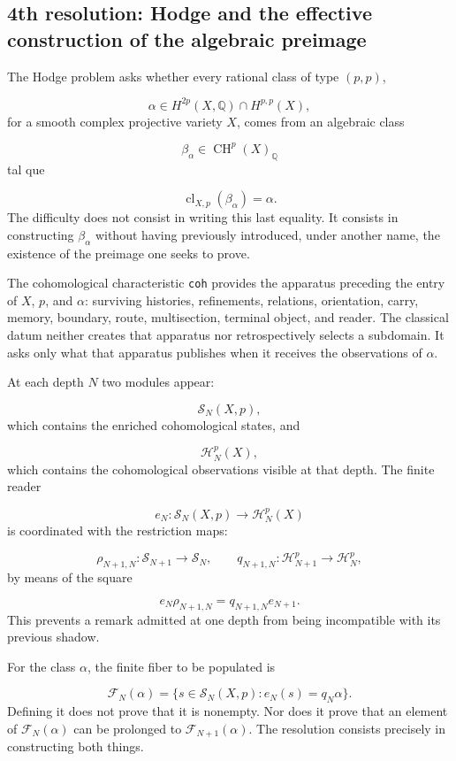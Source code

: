 \subsection{4th resolution: Hodge and the effective construction of the algebraic preimage}
The Hodge problem asks whether every rational class of type \((p,p)\),\par
\[
\alpha\in
H^{2p}(X,\mathbb Q)\cap H^{p,p}(X),
\]
for a smooth complex projective variety \(X\), comes from an algebraic class\par
\[
\beta_\alpha\in \operatorname{CH}^{p}(X)_{\mathbb Q}
\]
tal que\par
\[
\operatorname{cl}_{X,p}(\beta_\alpha)=\alpha.
\]
The difficulty does not consist in writing this last equality. It consists in constructing \(\beta_\alpha\) without having previously introduced, under another name, the existence of the preimage one seeks to prove.\par
The cohomological characteristic \texttt{coh} provides the apparatus preceding the entry of \(X\), \(p\), and \(\alpha\): surviving histories, refinements, relations, orientation, carry, memory, boundary, route, multisection, terminal object, and reader. The classical datum neither creates that apparatus nor retrospectively selects a subdomain. It asks only what that apparatus publishes when it receives the observations of \(\alpha\).\par
At each depth \(N\) two modules appear:\par
\[
\mathscr S_N(X,p),
\]
which contains the enriched cohomological states, and\par
\[
\mathscr H_N^p(X),
\]
which contains the cohomological observations visible at that depth. The finite reader\par
\[
e_N:\mathscr S_N(X,p)\longrightarrow\mathscr H_N^p(X)
\]
is coordinated with the restriction maps:\par
\[
\rho_{N+1,N}:\mathscr S_{N+1}\longrightarrow\mathscr S_N,
\qquad
q_{N+1,N}:\mathscr H_{N+1}^p\longrightarrow\mathscr H_N^p,
\]
by means of the square\par
\[
e_N\rho_{N+1,N}
=
q_{N+1,N}e_{N+1}.
\]
This prevents a remark admitted at one depth from being incompatible with its previous shadow.\par
For the class \(\alpha\), the finite fiber to be populated is\par
\[
\mathscr F_N(\alpha)
=
\{s\in\mathscr S_N(X,p):e_N(s)=q_N\alpha\}.
\]
Defining it does not prove that it is nonempty. Nor does it prove that an element of \(\mathscr F_N(\alpha)\) can be prolonged to \(\mathscr F_{N+1}(\alpha)\). The resolution consists precisely in constructing both things.\par
{}
